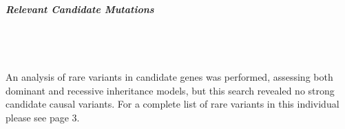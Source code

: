 {\Large \textbf{\textit{Relevant Candidate Mutations}}} \\ \\ 
\\ \\ \\
{\large An analysis of rare variants in candidate genes was performed, assessing both dominant and recessive inheritance models, but this search revealed no strong candidate causal variants. For a complete list of rare variants in this individual please see page 3.}
\newpage

